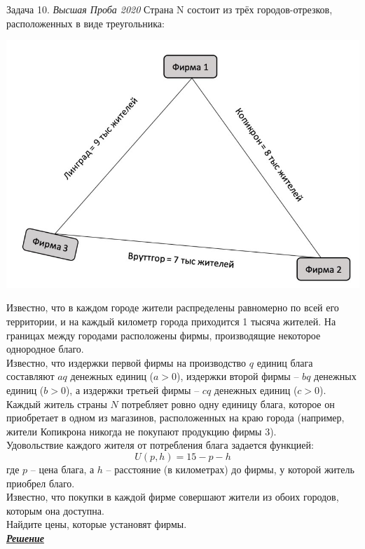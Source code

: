 \begin{mybox}{Задача 10. \textit{Высшая Проба 2020}}
    \indent\setlength{\parindent}{1em}\indent\setlength{\parindent}{1em}Страна N состоит из трёх городов-отрезков,
    расположенных в виде треугольника:
    \begin{center}
        \includegraphics[width=0.5\linewidth]{static/4_9}
    \end{center}
    \indent\setlength{\parindent}{1em}\indent\setlength{\parindent}{1em}Известно, что в каждом городе жители
    распределены равномерно по всей его территории, и на каждый километр города приходится 1 тысяча жителей. На
    границах между городами расположены фирмы, производящие некоторое однородное благо.\\
    \indent\setlength{\parindent}{1em}Известно, что издержки первой фирмы на производство $q$ единиц блага составляют
    $aq$ денежных единиц ($a>0$), издержки второй фирмы – $bq$ денежных единиц ($b>0$), а издержки третьей фирмы – $cq$
    денежных единиц ($c>0$).\\
    \indent\setlength{\parindent}{1em}Каждый житель страны $N$ потребляет ровно одну единицу блага, которое он
    приобретает в одном из магазинов, расположенных на краю города (например, жители Копикрона никогда не покупают
    продукцию фирмы 3).\\
    \indent\setlength{\parindent}{1em}Удовольствие каждого жителя от потребления блага задается функцией:
    $$U(p,h)=15-p-h$$
    \indent\setlength{\parindent}{1em}где $p$ – цена блага, а $h$ – расстояние (в километрах) до фирмы, у которой житель
    приобрел благо.\\
    \indent\setlength{\parindent}{1em}Известно, что покупки в каждой фирме совершают жители из обоих городов, которым
    она доступна.\\
    \indent\setlength{\parindent}{1em}Найдите цены, которые установят фирмы.\bigskip\\
    \textit{\textbf{\centering\href{https://iloveeconomics.ru/sites/default/files/olimp/proba/2020/proba_2020_2020_ekonomika_2_etap_10_klass_19909.docx}{Решение}}}
\end{mybox}

